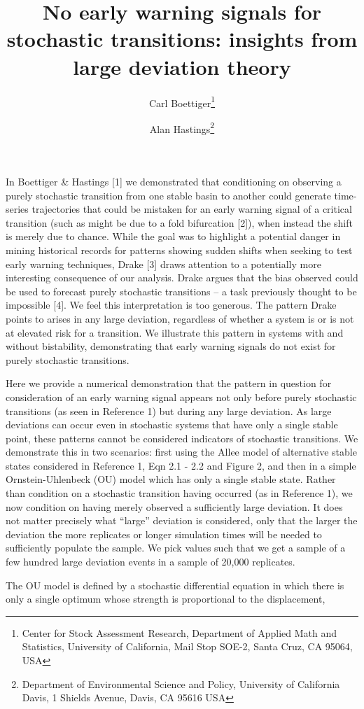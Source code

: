 \documentclass{article}
\title{No early warning signals for stochastic transitions: insights from large
       deviation theory}
\author{%
  Carl Boettiger\thanks{Center for Stock Assessment Research, Department of Applied Math and Statistics, University of California, Mail Stop SOE-2, Santa Cruz, CA 95064, USA} \and Alan Hastings\thanks{Department of Environmental Science and Policy, University of California Davis, 1 Shields Avenue, Davis, CA 95616 USA}}
\begin{document}
  
\maketitle


In Boettiger \& Hastings {[}1{]} we demonstrated that conditioning on
observing a purely stochastic transition from one stable basin to
another could generate time-series trajectories that could be mistaken
for an early warning signal of a critical transition (such as might be
due to a fold bifurcation {[}2{]}), when instead the shift is merely due
to chance. While the goal was to highlight a potential danger in mining
historical records for patterns showing sudden shifts when seeking to
test early warning techniques, Drake {[}3{]} draws attention to a
potentially more interesting consequence of our analysis. Drake argues
that the bias observed could be used to forecast purely stochastic
transitions -- a task previously thought to be impossible {[}4{]}. We
feel this interpretation is too generous. The pattern Drake points to
arises in any large deviation, regardless of whether a system is or is
not at elevated risk for a transition. We illustrate this pattern in
systems with and without bistability, demonstrating that early warning
signals do not exist for purely stochastic transitions.

Here we provide a numerical demonstration that the pattern in question
for consideration of an early warning signal appears not only before
purely stochastic transitions (as seen in Reference 1) but during any
large deviation. As large deviations can occur even in stochastic
systems that have only a single stable point, these patterns cannot be
considered indicators of stochastic transitions. We demonstrate this in
two scenarios: first using the Allee model of alternative stable states
considered in Reference 1, Eqn 2.1 - 2.2 and Figure 2, and then in a
simple Ornstein-Uhlenbeck (OU) model which has only a single stable
state. Rather than condition on a stochastic transition having occurred
(as in Reference 1), we now condition on having merely observed a
sufficiently large deviation. It does not matter precisely what
``large'' deviation is considered, only that the larger the deviation
the more replicates or longer simulation times will be needed to
sufficiently populate the sample. We pick values such that we get a
sample of a few hundred large deviation events in a sample of 20,000
replicates.

The OU model is defined by a stochastic differential equation in which
there is only a single optimum whose strength is proportional to the
displacement,
\end{document}

